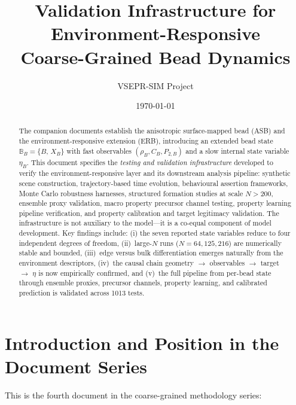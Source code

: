 \documentclass[11pt]{article}
\title{Validation Infrastructure for Environment-Responsive\\
Coarse-Grained Bead Dynamics}
\author{VSEPR-SIM Project}
\date{\today}
\begin{document}
\maketitle

\begin{abstract}
The companion documents establish the anisotropic surface-mapped bead
(ASB) and the environment-responsive extension (ERB), introducing an
extended bead state $\mathbb{B}_B = \{B,\, X_B\}$ with fast observables
$(\rho_B, C_B, P_{2,B})$ and a slow internal state variable $\eta_B$.
This document specifies the \emph{testing and validation infrastructure}
developed to verify the environment-responsive layer and its downstream
analysis pipeline: synthetic scene construction, trajectory-based time
evolution, behavioural assertion frameworks, Monte Carlo robustness
harnesses, structured formation studies at scale $N > 200$, ensemble
proxy validation, macro property precursor channel testing, property
learning pipeline verification, and property calibration and target
legitimacy validation.  The infrastructure is not auxiliary to the
model---it is a co-equal component of model development.  Key findings
include: (i) the seven reported state variables reduce to four
independent degrees of freedom, (ii)~large-$N$ runs ($N = 64, 125, 216$)
are numerically stable and bounded, (iii)~edge versus bulk differentiation
emerges naturally from the environment descriptors, (iv)~the causal
chain geometry $\to$ observables $\to$ target $\to$ $\eta$ is now
empirically confirmed, and (v)~the full pipeline from per-bead state
through ensemble proxies, precursor channels, property learning, and
calibrated prediction is validated across 1013 tests.
\end{abstract}

\tableofcontents
\newpage

\section{Introduction and Position in the Document Series}

This is the fourth document in the coarse-grained methodology series:
\end{document}
